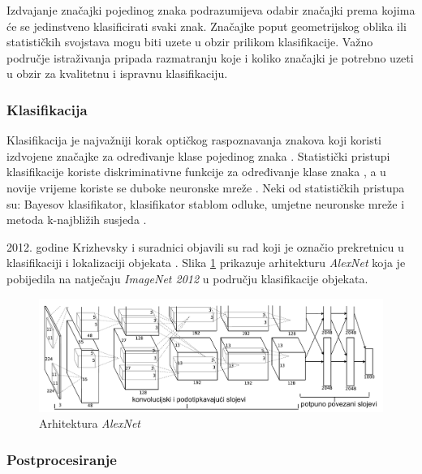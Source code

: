 \documentclass[times, utf8, zavrsni]{fer}
\begin{document}
Izdvajanje značajki pojedinog znaka podrazumijeva odabir značajki prema kojima će
se jedinstveno klasificirati svaki znak. Značajke poput geometrijskog oblika ili
statističkih svojstava mogu biti uzete u obzir prilikom klasifikacije. Važno područje istraživanja pripada
razmatranju koje i koliko značajki je potrebno uzeti u obzir za kvalitetnu i ispravnu
klasifikaciju. \citep{DBLP:journals/corr/abs-1710-05703}

\subsubsection{Klasifikacija}

Klasifikacija je najvažniji korak optičkog raspoznavanja znakova \citep{verma2012survey} \citep{zhu2016novel}
koji koristi izdvojene značajke za određivanje klase pojedinog znaka \citep{lehal1999feature} \citep{kaur2016survey}.
Statistički pristupi klasifikacije koriste diskriminativne funkcije za određivanje klase znaka \citep{DBLP:journals/corr/abs-1710-05703},
a u novije vrijeme koriste se duboke neuronske mreže \citep{Jurin:2017:Master}.
Neki od statističkih pristupa su: Bayesov klasifikator, klasifikator stablom odluke, umjetne neuronske mreže i
metoda k-najbližih susjeda \citep{DBLP:journals/corr/abs-1710-05703}.

2012. godine Krizhevsky i suradnici \citep{krizhevsky2012imagenet} objavili su rad koji je
označio prekretnicu u klasifikaciji i lokalizaciji objekata \citep{Jurin:2017:Master}. Slika
\ref{fig:deep-example-01} prikazuje arhitekturu \emph{AlexNet} koja je pobijedila na natječaju
\emph{ImageNet 2012} u području klasifikacije objekata. \citep{Jurin:2017:Master}

\begin{figure}[htb]
    \centering
    \includegraphics[width=\textwidth]{images/deep-example-01.png}
    \caption{Arhitektura \emph{AlexNet} \citep{Jurin:2017:Master}}
    \label{fig:deep-example-01}
\end{figure}

\subsubsection{Postprocesiranje}
\end{document}
